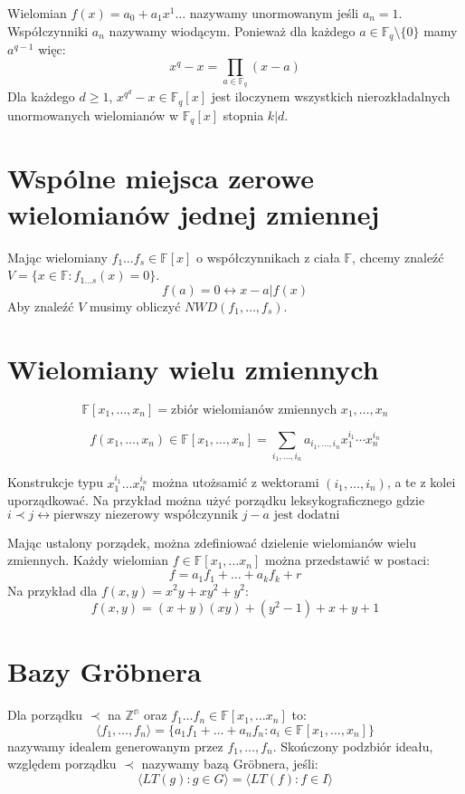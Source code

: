 \documentclass{../notatki}
\begin{document}
Wielomian $f(x) = a_0 + a_1x^1 \dots$ nazywamy unormowanym jeśli $a_n = 1$.
Współczynniki $a_n$ nazywamy wiodącym. Ponieważ dla każdego $a \in
\mathbb{F}_q \setminus \{0\}$ mamy $a^{q-1}$ więc:
$$
x^q - x = \prod_{a \in \mathbb{F}_q} (x - a)
$$
Dla każdego $d \ge 1$, $x^{q^d} - x \in \mathbb{F}_q[x]$ jest
iloczynem wszystkich
nierozkładalnych unormowanych wielomianów w $\mathbb{F}_q[x]$ stopnia $k|d$.

\section{Wspólne miejsca zerowe wielomianów jednej zmiennej}

Mając wielomiany $f_1 \dots f_s \in \mathbb{F}[x]$ o współczynnikach
z ciała $\mathbb{F}$, chcemy znaleźć $V = \{x \in \mathbb{F}: f_{1
\dots s}(x) = 0 \}$.
$$
f(a) = 0 \leftrightarrow x - a | f(x)
$$
Aby znaleźć $V$ musimy obliczyć $NWD(f_1, \dots, f_s)$.

\section{Wielomiany wielu zmiennych}

$$
\mathbb{F}[x_1, \dots, x_n] = \text{zbiór wielomianów zmiennych }
x_1, \dots, x_n
$$

$$
f(x_1, \dots, x_n) \in \mathbb{F}[x_1, \dots, x_n] = \sum_{i_1, \dots,
i_n} a_{i_1, \dots, i_n} x_1^{i_1} \cdots x_n^{i_n}
$$

Konstrukcje typu $x_1^{i_1} \dots x_n^{i_n}$ można utożsamić z
wektorami $(i_1, \dots, i_n)$, a te z kolei uporządkować. Na przykład można użyć
porządku leksykograficznego gdzie $i \prec j \leftrightarrow
\text{pierwszy niezerowy współczynnik } j - a \text{ jest dodatni}$

Mając ustalony porządek, można zdefiniować dzielenie wielomianów
wielu zmiennych. Każdy wielomian $f \in \mathbb{F}[x_1, \dots x_n]$
można przedstawić w postaci:
$$
f = a_1f_1 + \dots + a_kf_k + r
$$
Na przykład dla $f(x, y) = x^2y + xy^2 + y^2$:
$$
f(x, y) = (x + y)(xy) + (y^2 - 1) + x + y + 1
$$

\section{Bazy Gröbnera}

Dla porządku $\prec$ na $\mathbb{Z^n}$ oraz $f_1 \dots f_n \in
\mathbb{F}[x_1, \dots x_n]$ to:
$$
\langle f_1, \dots, f_n \rangle = \{a_1f_1 + \dots + a_nf_n : a_i \in
\mathbb{F}[x_1, \dots, x_n]\}
$$
nazywamy idealem generowanym przez $f_1, \dots, f_n$. Skończony podzbiór ideału,
względem porządku $\prec$ nazywamy bazą Gröbnera, jeśli:
$$
\langle LT(g) : g \in G \rangle = \langle LT(f) : f \in I \rangle
$$
\end{document}
